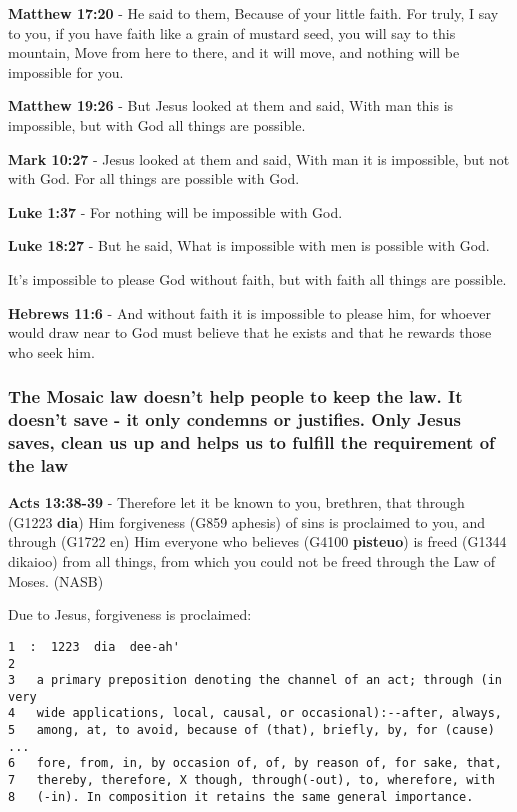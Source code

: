 \documentclass[11pt]{article}
\begin{document}
\textbf{Matthew 17:20} - He said to them, Because of your little faith. For truly, I say to you, if you have faith like a grain of mustard seed, you will say to this mountain, Move from here to there, and it will move, and nothing will be impossible for you.

\textbf{Matthew 19:26} - But Jesus looked at them and said, With man this is impossible, but with God all things are possible.

\textbf{Mark 10:27} - Jesus looked at them and said, With man it is impossible, but not with God. For all things are possible with God.

\textbf{Luke 1:37} - For nothing will be impossible with God.

\textbf{Luke 18:27} - But he said, What is impossible with men is possible with God.

It's impossible to please God without faith, but with faith all things are possible.

\textbf{Hebrews 11:6} - And without faith it is impossible to please him, for whoever would draw near to God must believe that he exists and that he rewards those who seek him.

\subsubsection{The Mosaic law doesn't help people to keep the law. It doesn't save - it only condemns or justifies. Only Jesus saves, clean us up and helps us to fulfill the requirement of the law}
\label{sec:orga0f9cb7}

\textbf{Acts 13:38-39} - Therefore let it be known to you, brethren, that through (G1223 \textbf{dia}) Him forgiveness (G859 aphesis) of sins is proclaimed to you, and through (G1722 en) Him everyone who believes (G4100 \textbf{pisteuo}) is freed (G1344 dikaioo) from all things, from which you could not be freed through the Law of Moses. (NASB)

Due to Jesus, forgiveness is proclaimed:

\begin{verbatim}
1  :  1223  dia  dee-ah'
2  
3   a primary preposition denoting the channel of an act; through (in very
4   wide applications, local, causal, or occasional):--after, always,
5   among, at, to avoid, because of (that), briefly, by, for (cause) ...
6   fore, from, in, by occasion of, of, by reason of, for sake, that,
7   thereby, therefore, X though, through(-out), to, wherefore, with
8   (-in). In composition it retains the same general importance.
\end{verbatim}
\end{document}
